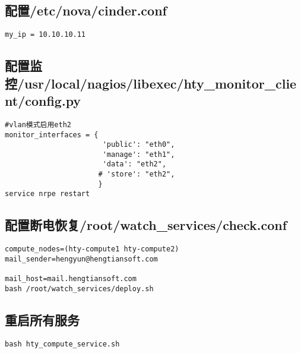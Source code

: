 \documentclass[a4paper,left=1.5cm,right=1.5cm,11pt]{article}
\begin{document}
\subsection{配置/etc/nova/cinder.conf}
\begin{lstlisting}
my_ip = 10.10.10.11
\end{lstlisting}
\subsection{配置监控/usr/local/nagios/libexec/hty_monitor_client/config.py}
\begin{lstlisting}
#vlan模式启用eth2
monitor_interfaces = {
                       'public': "eth0",
                       'manage': "eth1",
                       'data': "eth2",
                      # 'store': "eth2",
                      }
service nrpe restart
\end{lstlisting}
\subsection{配置断电恢复/root/watch_services/check.conf}
\begin{lstlisting}
compute_nodes=(hty-compute1 hty-compute2)
mail_sender=hengyun@hengtiansoft.com

mail_host=mail.hengtiansoft.com
bash /root/watch_services/deploy.sh
\end{lstlisting}
\subsection{重启所有服务}
\begin{lstlisting}
bash hty_compute_service.sh
\end{lstlisting}
\end{document}
